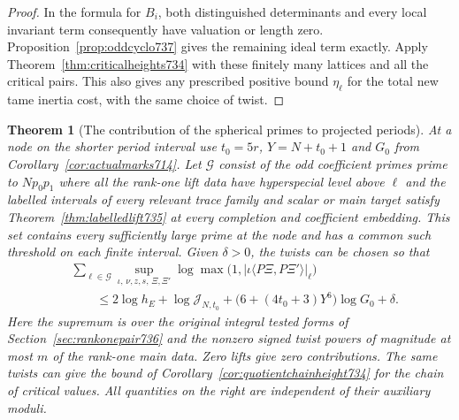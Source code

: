\documentclass[a4paper,11pt]{article}
\newtheorem{theorem}[proposition]{Theorem}
\theoremstyle{definition}
\theoremstyle{remark}
\numberwithin{equation}{section}
\begin{document}
\begin{proof}
In the formula for \(B_i\), both distinguished determinants and
every local invariant term consequently have valuation or length
zero. Proposition~\ref{prop:oddcyclo737} gives the remaining ideal
term exactly. Apply Theorem~\ref{thm:criticalheights734} with
these finitely many lattices and all the critical pairs. This
also gives any prescribed positive bound \(\eta_\ell\) for the
total new tame inertia cost, with the same choice of twist.
\end{proof}

\begin{theorem}[The contribution of the spherical primes to projected periods]
\leavevmode\label{thm:rankonespherical737}
At a node on the shorter period interval use \(t_0=5r\),
\(Y=N+t_0+1\) and \(G_0\) from Corollary~\ref{cor:actualmarks714}.
Let \(\mathcal G\) consist of the odd coefficient primes prime to
\(Np_0p_1\) where all the rank-one lift data have hyperspecial
level above \(\ell\) and the labelled intervals of every relevant
trace family and scalar or main target satisfy
Theorem~\ref{thm:labelledlift735} at every completion and
coefficient embedding. This set contains every sufficiently large
prime at the node and has a common such threshold on each finite
interval. Given \(\delta>0\), the twists can be chosen so that
\[
\begin{split}
 &\sum_{\ell\in\mathcal G}
    \sup_{\iota,\,\nu,z,s,\,\Xi,\Xi'}
       \log\max\bigl(1,|\iota\langle P\Xi,P\Xi'\rangle|_\ell\bigr)\\
 &\qquad\le
     2\log h_E+\log\mathcal J_{N,t_0}
       +\bigl(6+(4t_0+3)Y^6\bigr)\log G_0+\delta .
\end{split}
\]
Here the supremum is over the original integral tested forms of
Section~\ref{sec:rankonepair736} and the nonzero signed twist powers
of magnitude at most \(m\) of the rank-one main data. Zero lifts give
zero contributions. The same twists can give the bound of
Corollary~\ref{cor:quotientchainheight734} for the chain of critical
values. All quantities on the right are independent of their
auxiliary moduli.
\end{theorem}
\end{document}
